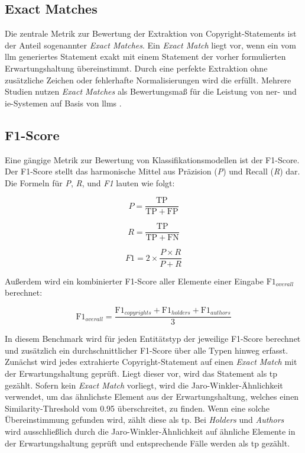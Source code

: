 \subsection{Exact Matches}
Die zentrale Metrik zur Bewertung der Extraktion von Copyright-Statements ist der Anteil sogenannter \textit{Exact Matches}.
Ein \textit{Exact Match} liegt vor, wenn ein vom \gls{llm} generiertes Statement exakt mit einem Statement der vorher formulierten Erwartungshaltung übereinstimmt.
Durch eine perfekte Extraktion ohne zusätzliche Zeichen oder fehlerhafte Normalisierungen wird die  erfüllt.
Mehrere Studien nutzen \textit{Exact Matches} als Bewertungsmaß für die Leistung von \gls{ner}- und \gls{ie}-Systemen auf Basis von \glspl{llm} \autocite{dunn_structured_2022} \autocite{hu_improving_2024}.

\subsection{F1-Score}
Eine gängige Metrik zur Bewertung von Klassifikationsmodellen ist der F1-Score\autocite{noauthor_f-score_2025}.
Der F1-Score stellt das harmonische Mittel aus Präzision (\textit{P}) und Recall (\textit{R}) dar.
Die Formeln für \textit{P}, \textit{R}, und \textit{F1} lauten wie folgt:

\[
 P = \frac{\mathrm{TP}}{\mathrm{TP} + \mathrm{FP}}
\]

\[
 R = \frac{\mathrm{TP}}{\mathrm{TP} + \mathrm{FN}}
\]

\[
 F1 = 2 \times \frac{P \times R}{P + R}
\]

Außerdem wird ein kombinierter F1-Score aller Elemente einer Eingabe $\mathrm{F1}_{overall}$ berechnet:

\[
 \mathrm{F1}_{overall} = \frac{\mathrm{F1}_{copyrights} + \mathrm{F1}_{holders} + \mathrm{F1}_{authors}}{3}
\]

In diesem Benchmark wird für jeden Entitätstyp der jeweilige F1-Score berechnet und zusätzlich ein durchschnittlicher F1-Score über alle Typen hinweg erfasst.
Zunächst wird jedes extrahierte Copyright-Statement auf einen \textit{Exact Match} mit der Erwartungshaltung geprüft.
Liegt dieser vor, wird das Statement als \gls{tp} gezählt.
Sofern kein \textit{Exact Match} vorliegt, wird die Jaro-Winkler-Ähnlichkeit \autocite{noauthor_jarowinkler_nodate} verwendet, um das ähnlichste Element aus der Erwartungshaltung, welches einen Similarity-Threshold vom \num{0,95} überschreitet, zu finden.
Wenn eine solche Übereinstimmung gefunden wird, zählt diese als \gls{tp}.
Bei \textit{Holders} und \textit{Authors} wird ausschließlich durch die Jaro-Winkler-Ähnlichkeit auf ähnliche Elemente in der Erwartungshaltung geprüft und entsprechende Fälle werden als \gls{tp} gezählt.

